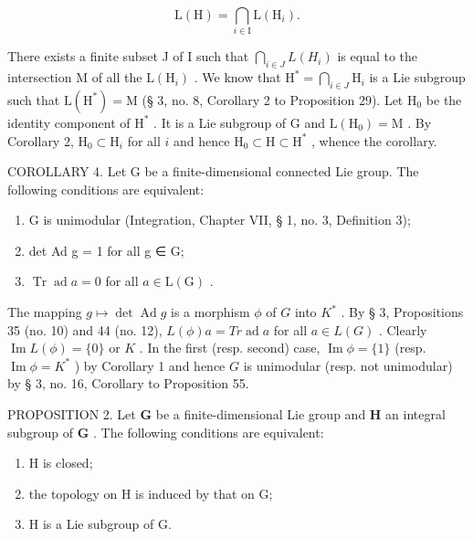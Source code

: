 \[
\mathrm{L} (\mathrm{H}) = \bigcap_ {i \in \mathrm{I}} \mathrm{L} (\mathrm{H} _ {i}).
\]

There exists a finite subset J of I such that \(\bigcap_{i\in J}L(H_i)\) is equal to the intersection M of all the \(\mathrm{L}(\mathrm{H}_i)\) . We know that \(\mathrm{H}^* = \bigcap_{i\in J}\mathrm{H}_i\) is a Lie subgroup such that \(\mathrm{L}(\mathrm{H}^*) = \mathrm{M}\) (§ 3, no. 8, Corollary 2 to Proposition 29). Let \(\mathrm{H}_0\) be the identity component of \(\mathrm{H}^*\) . It is a Lie subgroup of G and \(\mathrm{L}(\mathrm{H}_0) = \mathrm{M}\) . By Corollary 2, \(\mathrm{H}_0\subset \mathrm{H}_i\) for all \(i\) and hence \(\mathrm{H}_0\subset \mathrm{H}\subset \mathrm{H}^*\) , whence the corollary.

COROLLARY 4. Let G be a finite-dimensional connected Lie group. The following conditions are equivalent:

\begin{enumerate}
\def\labelenumi{(\roman{enumi})}
\item
  G is unimodular (Integration, Chapter VII, § 1, no. 3, Definition 3);
\item
  det Ad g = 1 for all g ∈ G;
\item
  \(\operatorname{Tr} \operatorname{ad} a = 0\) for all \(a \in \mathrm{L}(\mathrm{G})\) .
\end{enumerate}

The mapping \(g \mapsto \operatorname{det} \operatorname{Ad} g\) is a morphism \(\phi\) of \(G\) into \(K^*\) . By § 3, Propositions 35 (no. 10) and 44 (no. 12), \(L(\phi)a = Tr\operatorname{ad} a\) for all \(a \in L(G)\) . Clearly \(\operatorname{Im} L(\phi) = \{0\}\) or \(K\) . In the first (resp. second) case, \(\operatorname{Im} \phi = \{1\}\) (resp. \(\operatorname{Im} \phi = K^*\) ) by Corollary 1 and hence \(G\) is unimodular (resp. not unimodular) by § 3, no. 16, Corollary to Proposition 55.

PROPOSITION 2. Let \(\mathbf{G}\) be a finite-dimensional Lie group and \(\mathbf{H}\) an integral subgroup of \(\mathbf{G}\) . The following conditions are equivalent:

\begin{enumerate}
\def\labelenumi{(\roman{enumi})}
\item
  H is closed;
\item
  the topology on H is induced by that on G;
\item
  H is a Lie subgroup of G.
\end{enumerate}

